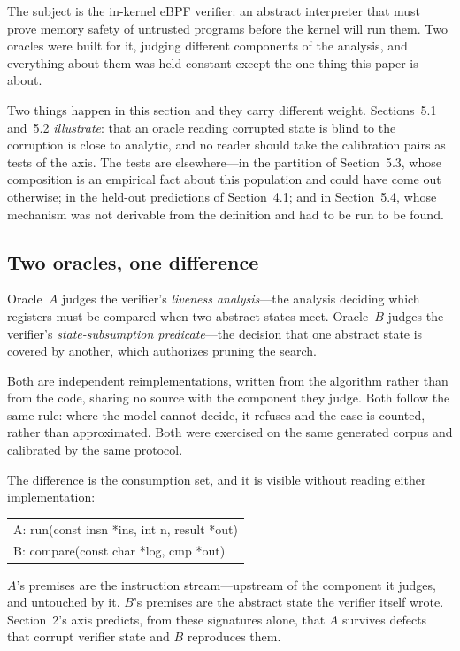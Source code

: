 The subject is the in-kernel eBPF verifier: an abstract interpreter that must prove
memory safety of untrusted programs before the kernel will run them. Two oracles
were built for it, judging different components of the analysis, and everything
about them was held constant except the one thing this paper is about.

Two things happen in this section and they carry different weight. Sections~5.1
and~5.2 \emph{illustrate}: that an oracle reading corrupted state is blind to the
corruption is close to analytic, and no reader should take the calibration pairs as
tests of the axis. The tests are elsewhere---in the partition of Section~5.3, whose
composition is an empirical fact about this population and could have come out
otherwise; in the held-out predictions of Section~4.1; and in Section~5.4, whose
mechanism was not derivable from the definition and had to be run to be found.

\subsection{Two oracles, one difference}

Oracle~$A$ judges the verifier's \emph{liveness analysis}---the analysis deciding
which registers must be compared when two abstract states meet. Oracle~$B$ judges
the verifier's \emph{state-subsumption predicate}---the decision that one abstract
state is covered by another, which authorizes pruning the search.

Both are independent reimplementations, written from the algorithm rather than from
the code, sharing no source with the component they judge. Both follow the same
rule: where the model cannot decide, it refuses and the case is counted, rather than
approximated. Both were exercised on the same generated corpus and calibrated by the
same protocol.

The difference is the consumption set, and it is visible without reading either
implementation:

\begin{center}
\ttfamily\footnotesize\raggedright
\begin{tabular}{@{}l@{}}
A: run(const insn *ins, int n, result *out)\\
B: compare(const char *log, cmp *out)
\end{tabular}
\end{center}

\noindent$A$'s premises are the instruction stream---upstream of the component it
judges, and untouched by it. $B$'s premises are the abstract state the verifier
itself wrote. Section~2's axis predicts, from these signatures alone, that $A$
survives defects that corrupt verifier state and $B$ reproduces them.

